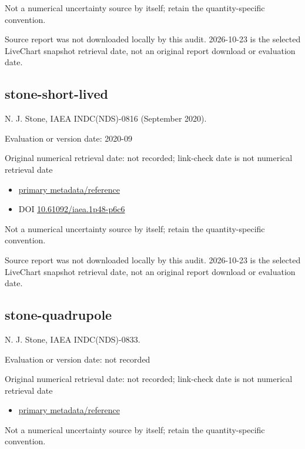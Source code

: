 \documentclass[
  11pt,
  letterpaper,
]{article}
\providecommand{\tightlist}{%
  \setlength{\itemsep}{0pt}\setlength{\parskip}{0pt}}
\begin{document}
Not a numerical uncertainty source by itself; retain the
quantity-specific convention.

Source report was not downloaded locally by this audit. 2026-10-23 is
the selected LiveChart snapshot retrieval date, not an original report
download or evaluation date.

\subsection{stone-short-lived}\label{stone-short-lived}

N. J. Stone, IAEA INDC(NDS)-0816 (September 2020).

Evaluation or version date: 2020-09

Original numerical retrieval date: not recorded; link-check date is not
numerical retrieval date

\begin{itemize}
\tightlist
\item
  \href{https://nds.iaea.org/records/5g7ec-evw90}{primary
  metadata/reference}
\item
  DOI
  \href{https://doi.org/10.61092/iaea.1p48-p6c6}{10.61092/iaea.1p48-p6c6}
\end{itemize}

Not a numerical uncertainty source by itself; retain the
quantity-specific convention.

Source report was not downloaded locally by this audit. 2026-10-23 is
the selected LiveChart snapshot retrieval date, not an original report
download or evaluation date.

\subsection{stone-quadrupole}\label{stone-quadrupole}

N. J. Stone, IAEA INDC(NDS)-0833.

Evaluation or version date: not recorded

Original numerical retrieval date: not recorded; link-check date is not
numerical retrieval date

\begin{itemize}
\tightlist
\item
  \href{https://nds.iaea.org/records/xk3d8-tw250}{primary
  metadata/reference}
\end{itemize}

Not a numerical uncertainty source by itself; retain the
quantity-specific convention.
\end{document}
